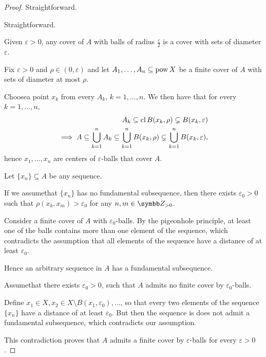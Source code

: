 \begin{proof}
   Straightforward.

   Straightforward.

   Given \( \varepsilon > 0 \), any cover of \( A \) with balls of radius \( \frac \varepsilon 2 \) is a cover with sets of diameter \( \varepsilon \).

   Fix \( \varepsilon > 0 \) and \( \rho \in (0, \varepsilon) \) and let \( A_1, \ldots, A_n \subseteq \operatorname{pow} X \) be a finite cover of \( A \) with sets of diameter at most \( \rho \).

  Choose\AOC a point \( x_k \) from every \( A_k \), \( k = 1, \ldots, n \). We then have that for every \( k = 1, \ldots, n \),
  \begin{align*}
    A_k \subseteq \operatorname{cl} B(x_k, \rho) \subsetneq B(x_k, \varepsilon)
    \\
    \implies A \subseteq \bigcup_{k=1}^n A_k \subseteq \bigcup_{k=1}^n B(x_k, \rho) \subsetneq \bigcup_{k=1}^n B(x_k, \varepsilon),
  \end{align*}
  hence \( x_1, \ldots, x_n \) are centers of \( \varepsilon \)-balls that cover \( A \).

   Let \( \{ x_n \} \subseteq A \) be any sequence.

  If we assume\LEM that \( \{ x_n \} \) has no fundamental subsequence, then there exists \( \varepsilon_0 > 0 \) such that \( \rho(x_k, x_m) > \varepsilon_0 \) for any \( n, m \in \BZ_{>0} \).

  Consider a finite cover of \( A \) with \( \varepsilon_0 \)-balls. By the pigeonhole principle, at least one of the balls contains more than one element of the sequence, which contradicts the assumption that all elements of the sequence have a distance of at least \( \varepsilon_0 \).

  Hence an arbitrary sequence in \( A \) has a fundamental subsequence.

   Assume\LEM that there exists \( \varepsilon_0 > 0 \), such that \( A \) admits no finite cover by \( \varepsilon_0 \)-balls.

  Define \( x_1 \in X, x_2 \in X \setminus B(x_1, \varepsilon_0), \ldots \), so that every two elements of the sequence \( \{ x_n \} \) have a distance of at least \( \varepsilon_0 \). But then the sequence is does not admit a fundamental subsequence, which contradicts our assumption.

  This contradiction proves that \( A \) admits a finite cover by \( \varepsilon \)-balls for every \( \varepsilon > 0 \).
\end{proof}

